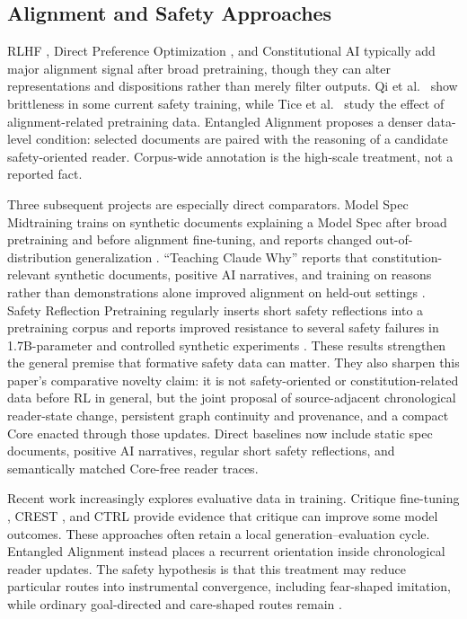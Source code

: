 \subsection{Alignment and Safety Approaches}

RLHF \cite{christiano2017deep}, Direct Preference Optimization
\cite{rafailov2023dpo}, and Constitutional AI \cite{bai2022constitutional}
typically add major alignment signal after broad pretraining, though they can
alter representations and dispositions rather than merely filter outputs. Qi et
al.\ \cite{qi2024safety} show brittleness in some current safety training, while
Tice et al.\ \cite{betley2025alignment} study the effect of alignment-related
pretraining data. Entangled Alignment proposes a denser data-level condition:
selected documents are paired with the reasoning of a candidate
safety-oriented reader.
Corpus-wide annotation is the high-scale treatment, not a reported fact.

Three subsequent projects are especially direct comparators. Model Spec
Midtraining trains on synthetic documents explaining a Model Spec after broad
pretraining and before alignment fine-tuning, and reports changed
out-of-distribution generalization \cite{li2026modelspec}. ``Teaching Claude
Why'' reports that constitution-relevant synthetic documents, positive AI
narratives, and training on reasons rather than demonstrations alone improved
alignment on held-out settings \cite{kutasov2026teachingclaudewhy}. Safety
Reflection Pretraining regularly inserts short safety reflections into a
pretraining corpus and reports improved resistance to several safety failures
in 1.7B-parameter and controlled synthetic experiments
\cite{li2026safetyreflection}. These results strengthen the general premise
that formative safety data can matter. They also sharpen this paper's
comparative novelty claim: it is not safety-oriented or constitution-related data before RL in
general, but the joint proposal of source-adjacent chronological reader-state
change, persistent graph continuity and provenance, and a compact Core enacted
through those updates. Direct baselines now include static spec documents,
positive AI narratives, regular short safety reflections, and semantically
matched Core-free reader traces.

Recent work increasingly explores evaluative data in training. Critique
fine-tuning \cite{wang2025critiquefinetuninglearningcritique}, CREST
\cite{lee2025selftrainingmeetsconsistencyimproving}, and CTRL
\cite{xie2025teachinglanguagemodelscritique} provide evidence that critique can
improve some model outcomes. These approaches often retain a local
generation--evaluation cycle. Entangled Alignment instead places a recurrent
orientation inside chronological reader updates. The safety hypothesis is that
this treatment may reduce particular routes into instrumental convergence,
including fear-shaped imitation, while ordinary goal-directed and care-shaped
routes remain \cite{omohundro2008basic,bostrom2014superintelligence}.

